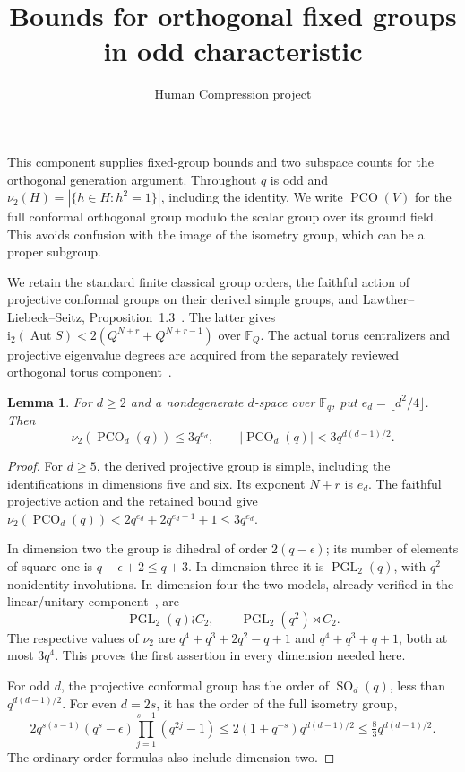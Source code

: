 \documentclass[11pt,a4paper]{article}
\title{Bounds for orthogonal fixed groups in odd characteristic}
\author{Human Compression project}\date{}
\newtheorem{lemma}{Lemma}\newtheorem{proposition}[lemma]{Proposition}
\newcommand{\F}{\mathbb F}\newcommand{\nuu}{\nu_2}
\newcommand{\PCO}{\operatorname{PCO}}
\begin{document}
\maketitle
This component supplies fixed-group bounds and two subspace counts for the orthogonal generation argument. Throughout $q$ is odd and
$\nuu(H)=|\{h\in H:h^2=1\}|$, including the identity.
We write $\PCO(V)$ for the full conformal orthogonal group modulo
the scalar group over its ground field. This avoids confusion with
the image of the isometry group, which can be a proper subgroup.

We retain the standard finite classical group orders, the faithful action
of projective conformal groups on their derived simple groups, and
Lawther--Liebeck--Seitz, Proposition~1.3~\cite{LLS}. The latter gives
$\mathrm i_2(\operatorname{Aut}S)<2(Q^{N+r}+Q^{N+r-1})$ over $\F_Q$.
The actual torus centralizers and projective eigenvalue degrees are
acquired from the separately reviewed orthogonal torus component~\cite{tori}.

\begin{lemma}\label{small}
For $d\ge2$ and a nondegenerate $d$-space over $\F_q$, put
$e_d=\lfloor d^2/4\rfloor$. Then
\[
 \nuu(\PCO_d(q))\le3q^{e_d},\qquad
 |\PCO_d(q)|<3q^{d(d-1)/2}.
\]
\end{lemma}
\begin{proof}
For $d\ge5$, the derived projective group is simple, including the
identifications in dimensions five and six. Its exponent $N+r$ is $e_d$.
The faithful projective action and the retained bound give
$\nuu(\PCO_d(q))<2q^{e_d}+2q^{e_d-1}+1\le3q^{e_d}$.

In dimension two the group is dihedral of order $2(q-\epsilon)$;
its number of elements of square one is $q-\epsilon+2\le q+3$.
In dimension three it is $\operatorname{PGL}_2(q)$, with $q^2$
nonidentity involutions. In dimension four the two models, already
verified in the linear/unitary component~\cite{linear}, are
\[
 \operatorname{PGL}_2(q)\wr C_2,\qquad
 \operatorname{PGL}_2(q^2)\rtimes C_2.
\]
The respective values of $\nuu$ are
$q^4+q^3+2q^2-q+1$ and $q^4+q^3+q+1$, both at most $3q^4$.
This proves the first assertion in every dimension needed here.

For odd $d$, the projective conformal group has the order of
$\operatorname{SO}_d(q)$, less than $q^{d(d-1)/2}$.
For even $d=2s$, it has the order of the full isometry group,
\[
 2q^{s(s-1)}(q^s-\epsilon)\prod_{j=1}^{s-1}(q^{2j}-1)
 \le2(1+q^{-s})q^{d(d-1)/2}\le\tfrac83 q^{d(d-1)/2}.
\]
The ordinary order formulas also include dimension two.
\end{proof}
\end{document}
